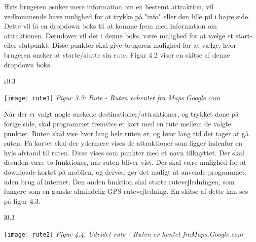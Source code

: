 Hvis brugeren øsnker mere information om en bestemt attraktion, vil vedkommende have mulighed for at trykke på "info" eller den lille pil i højre side. Dette vil få en dropdown boks til at komme frem med information om attraktionen. Derudover vil der i denne boks, være mulighed for at vælge et start- eller slutpunkt. Disse punkter skal give brugeren mulighed for at vælge, hvor brugeren ønsker at starte/slutte sin rute. Figur 4.2 viser en skitse af denne dropdown boks.\newline
\newline
\newline
\newline
\newline

\begin{wrapfigure}{r}{0.3\textwidth}
	\vspace{-30pt}
	\begin{center}
		\texttt{[image: rute1]} \newline
		\textit{Figur 3.3: Rute - Ruten er\newline hentet fra Maps.Google.com}\newline
	\end{center}
	\vspace{0pt}
	\vspace{-100pt}
\end{wrapfigure}


Når der er valgt nogle ønskede destinationer/attraktioner, og trykket done på forige side, skal programmet fremvise et kort med en rute mellem de valgte punkter. Ruten skal vise hvor lang hele ruten er, og hvor lang tid det tager at gå ruten. På kortet skal der ydermere vises de attraktioner som ligger indenfor en hvis afstand til ruten. Disse vises som punkter med et navn tilknyttet.
Der skal desuden være to funktioner, når ruten bliver vist. Der skal være mulighed for at downloade kortet på mobilen, og derved gør det muligt at anvende programmet, uden brug af internet. Den anden funktion skal starte rutevejledningen, som fungere som en ganske almindelig GPS-rutevejledning. En skitse af dette kan ses på figur 4.3.\newline
\newline
\newline
\newline

\begin{wrapfigure}{l}{0.3\textwidth}
	\vspace{-20pt}
	\begin{center}
		\texttt{[image: rute2]} \newline
		\textit{Figur 4.4: Udvidet rute - Ruten er hentet fra\newline Maps.Google.com}\newline
	\end{center}
	\vspace{-20pt}
	\vspace{-10pt}
\end{wrapfigure}

